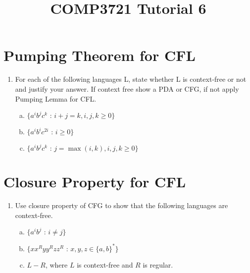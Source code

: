 \documentclass[a4paper]{article}
\date{}
\author{}
\title{COMP3721 Tutorial 6}
\theoremstyle{definition}
\numberwithin{equation}{subsection}
\begin{document}
\maketitle
\section{Pumping Theorem for CFL}
\begin{enumerate}[1.]
\item For each of the following languages L, state whether L is context‐free or not and justify your answer. If context free show a PDA or CFG, if not apply Pumping Lemma for CFL.
    \begin{enumerate}[(a)]
        \item $\{\text{$a^ib^jc^k$ : $i+j=k , i,j,k \geq 0$}\}$
        \item $\{\text{$a^ib^ic^{2i}$ : $i \geq 0 $}\}$
        \item $\{\text{$a^ib^jc^k$ : $j = \max(i,k), i,j,k \geq 0$}\}$
    \end{enumerate}
\end{enumerate}

\section{Closure Property for CFL}
\begin{enumerate}[1.]
\item Use closure property of CFG to show that the following languages are context-free.
\begin{enumerate}[(a)]
	\item $\{\text{$a^ib^j$ : $i\neq j $}\}$
	\item $\{\text{$xx^Ryy^Rzz^R$ : $x,y,z \in \{a,b\}^*$}\}$
	\item $L - R$, where $L$ is context-free and $R$ is regular.
\end{enumerate}
\end{enumerate}
\end{document}
